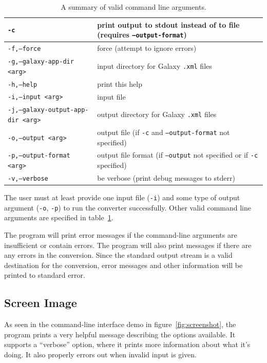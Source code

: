 \documentclass[12pt]{article}
\begin{document}
\begin{table}[htbp]
\begin{tabularx}{\textwidth}{| l | X |}
\hline
\texttt{-c}                                 & print output to stdout instead of to file (requires \texttt{--output-format}) \\
\hline
\texttt{-f,--force}                         & force (attempt to ignore errors) \\
\hline
\texttt{-g,--galaxy-app-dir <arg>}          & input directory for Galaxy \texttt{.xml} files \\
\hline
\texttt{-h,--help}                          & print this help \\
\hline
\texttt{-i,--input <arg>}                   & input file \\
\hline
\texttt{-j,--galaxy-output-app-dir <arg>}   & output directory for Galaxy \texttt{.xml} files \\
\hline
\texttt{-o,--output <arg>}                  & output file (if \texttt{-c} and \texttt{--output-format} not specified) \\
\hline
\texttt{-p,--output-format <arg>}           & output file format (if \texttt{--output} not specified or if \texttt{-c} specified) \\
\hline
\texttt{-v,--verbose}                       & be verbose (print debug messages to stderr) \\
\hline
\end{tabularx}
\caption{A summary of valid command line arguments.}
\label{argstable}
\end{table}

The user must at least provide one input file (\texttt{-i}) and some type of output argument (\texttt{-o}, \texttt{-p}) to run the converter successfully. Other valid command line arguments are specified in table~\ref{argstable}.

The program will print error messages if the command-line arguments are insufficient or contain errors. The program will also print messages if there are any errors in the conversion. Since the standard output stream is a valid destination for the conversion, error messages and other information will be printed to standard error.

\subsection{Screen Image}

As seen in the command-line interface demo in figure~\ref{fig:screenshot}, the program prints a very helpful message describing the options available. It supports a ``verbose'' option, where it prints more information about what it's doing. It also properly errors out when invalid input is given. 
\end{document}
